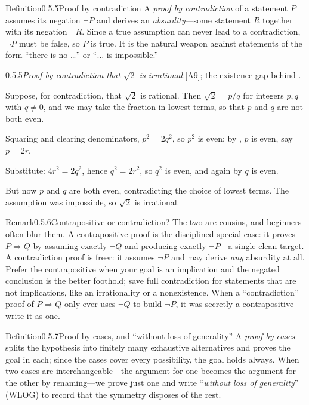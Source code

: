 \documentclass[main.tex]{subfiles}
\begin{document}
\begin{Obj}{Definition}{0.5.5}{Proof by contradiction}
A \emph{proof by contradiction} of a statement $P$ assumes its negation $\neg P$ and derives an
\emph{absurdity}---some statement $R$ together with its negation $\neg R$. Since a true assumption can
never lead to a contradiction, $\neg P$ must be false, so $P$ is true. It is the natural weapon
against statements of the form ``there is no \dots'' or ``$\dots$ is impossible.''
\end{Obj}

\begin{Prf}{0.5.5}{\itshape Proof by contradiction that $\sqrt2$ is irrational.}{[A9]; the existence
gap behind .}
\item Suppose, for contradiction, that $\sqrt2$ is rational. Then $\sqrt2=p/q$ for integers $p,q$
with $q\neq0$, and we may take the fraction in lowest terms, so that $p$ and $q$ are not both even.
\item Squaring and clearing denominators, $p^2=2q^2$, so $p^2$ is even; by , $p$ is even,
say $p=2r$.
\item Substitute: $4r^2=2q^2$, hence $q^2=2r^2$, so $q^2$ is even, and again by  $q$ is
even.
\item But now $p$ and $q$ are both even, contradicting the choice of lowest terms. The assumption was
impossible, so $\sqrt2$ is irrational.
\end{Prf}

\begin{ObjL}{Remark}{0.5.6}{Contrapositive or contradiction?}
The two are cousins, and beginners often blur them. A contrapositive proof is the disciplined special
case: it proves $P\Rightarrow Q$ by assuming exactly $\neg Q$ and producing exactly $\neg P$---a
single clean target. A contradiction proof is freer: it assumes $\neg P$ and may derive \emph{any}
absurdity at all. Prefer the contrapositive when your goal is an implication and the negated
conclusion is the better foothold; save full contradiction for statements that are not implications,
like an irrationality or a nonexistence. When a ``contradiction'' proof of $P\Rightarrow Q$ only ever
uses $\neg Q$ to build $\neg P$, it was secretly a contrapositive---write it as one.
\end{ObjL}

\begin{Obj}{Definition}{0.5.7}{Proof by cases, and ``without loss of generality''}
A \emph{proof by cases} splits the hypothesis into finitely many exhaustive alternatives and proves
the goal in each; since the cases cover every possibility, the goal holds always. When two cases are
interchangeable---the argument for one becomes the argument for the other by renaming---we prove just
one and write ``\emph{without loss of generality}'' (WLOG) to record that the symmetry disposes of the
rest.
\end{Obj}
\end{document}
